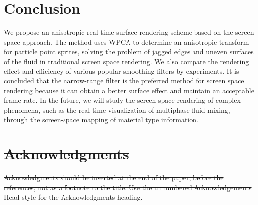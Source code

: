 \documentclass[times,twocolumn,final]{elsarticle}
\providecommand{\DIFdeltex}[1]{{\protect\color{red}\sout{#1}}}                      %
\providecommand{\DIFdelbegin}{} %
\providecommand{\DIFdelend}{} %
\providecommand{\DIFdel}[1]{\texorpdfstring{\DIFdeltex{#1}}{}} %
\begin{document}
\section{Conclusion}
We propose an anisotropic real-time surface rendering scheme based on the screen space approach. The method uses WPCA to determine an anisotropic transform for particle point sprites, solving the problem of jagged edges and uneven surfaces of the fluid in traditional screen space rendering. We also compare the rendering effect and efficiency of various popular smoothing filters by experiments. It is concluded that the narrow-range filter is the preferred method for screen space rendering because it can obtain a better surface effect and maintain an acceptable frame rate. In the future, we will study the screen-space rendering of complex phenomena, such as the real-time visualization of multiphase fluid mixing, through the screen-space mapping of material type information.
\DIFdelbegin %

\section*{\DIFdel{Acknowledgments}}
\DIFdel{Acknowledgments should be inserted at the end of the paper, before the
references, not as a footnote to the title. Use the unnumbered
Acknowledgements Head style for the Acknowledgments heading.
}\DIFdelend %






\end{document}
